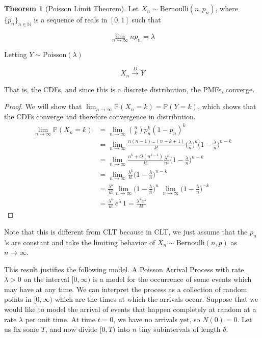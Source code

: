 \documentclass{article}
\theoremstyle{definition}
\newtheorem{theorem}{Theorem}[section]
\theoremstyle{remark}
\theoremstyle{definition}
\begin{document}
    \begin{theorem}[Poisson Limit Theorem]
      Let $X_n \sim \mathrm{Bernoulli}(n, p_n)$, where $\{p_n\}_{n \in \mathbb{N}}$ is a sequence of reals in $[0, 1]$ such that 

        \[\lim_{n \rightarrow \infty} n p_n = \lambda\]

      Letting $Y \sim \mathrm{Poisson}(\lambda)$

        \[X_n \xrightarrow{D} Y\]

      That is, the CDFs, and since this is a discrete distribution, the PMFs, converge. 
    \end{theorem}
    \begin{proof}
      We will show that $\lim_{n \rightarrow \infty} \mathbb{P}(X_n = k) = \mathbb{P}(Y = k)$, which shows that the CDFs converge and therefore convergence in distribution. 
      \begin{align*}
        \lim_{n \rightarrow \infty} \mathbb{P}(X_n = k) & = \lim_{n \rightarrow \infty} \binom{n}{k} p_n^k (1 - p_n)^k \\
        & = \lim_{n \rightarrow \infty} \frac{n (n - 1) \ldots (n - k + 1)}{k!} \bigg(\frac{\lambda}{n}\bigg)^k \bigg( 1 - \frac{\lambda}{n} \bigg)^{n - k} \\
        & = \lim_{n \rightarrow \infty} \frac{n^k + O(n^{k-1})}{k!} \frac{\lambda^k}{n^k} \bigg( 1 - \frac{\lambda}{n} \bigg)^{n - k} \\
        & = \lim_{n \rightarrow \infty} \frac{\lambda^k}{k!} \bigg( 1 - \frac{\lambda}{n} \bigg)^{n - k} \\
        & = \frac{\lambda^k}{k!} \lim_{n \rightarrow \infty} \bigg( 1 - \frac{\lambda}{n} \bigg)^n \; \lim_{n \rightarrow \infty} \bigg( 1 - \frac{\lambda}{n} \bigg)^{-k} \\
        & = \frac{\lambda^k}{k!} \, e^{\lambda} \, 1 = \frac{\lambda^k e^\lambda}{k!}
      \end{align*}
    \end{proof}

    Note that this is different from CLT because in CLT, we just assume that the $p_n$'s are constant and take the limiting behavior of $X_n \sim \mathrm{Bernoulli}(n, p)$ as $n \rightarrow \infty$. 

    This result justifies the following model. A Poisson Arrival Process with rate $\lambda > 0$ on the interval $[0, \infty)$ is a model for the occurrence of some events which may have at any time. We can interpret the process as a collection of random points in $[0, \infty)$ which are the times at which the arrivals occur. Suppose that we would like to model the arrival of events that happen completely at random at a rate $\lambda$ per unit time. At time $t = 0$, we have no arrivals yet, so $N(0) = 0$. Let us fix some $T$, and now divide $[0, T)$ into $n$ tiny subintervals of length $\delta$. 
\end{document}
